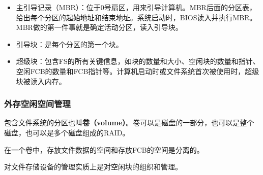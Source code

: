 \documentclass[12pt, a4paper, oneside]{ctexart}
\begin{document}
\begin{itemize}
  \item 主引导记录（MBR）：位于0号扇区，用来引导计算机。MBR后面的分区表，给出每个分区的起始地址和结束地址。系统启动时，BIOS读入并执行MBR。MBR做的第一件事就是确定活动分区，读入引导块。
  \item 引导块：是每个分区的第一个块。
  \item 超级块：包含FS的所有关键信息，如块的数量和大小、空闲块的数量和指针、空闲FCB的数量和FCB指针等。计算机启动时或文件系统首次被使用时，超级块被读入内存。
\end{itemize}

\subsubsection{外存空闲空间管理}

包含文件系统的分区也叫\textbf{卷（volume）}。卷可以是磁盘的一部分，也可以是整个磁盘，也可以是多个磁盘组成的RAID。

在一个卷中，存放文件数据的空间和存放FCB的空间是分离的。

对文件存储设备的管理实质上是对空闲块的组织和管理。
\end{document}
